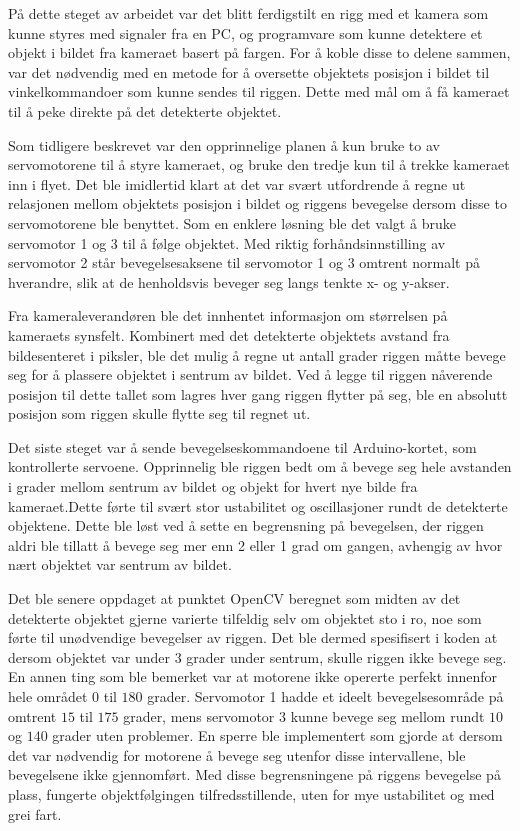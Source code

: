 På dette steget av arbeidet var det blitt ferdigstilt en rigg med et kamera som kunne styres med signaler fra en PC, og programvare som kunne detektere et objekt i bildet fra kameraet basert på fargen. For å koble disse to delene sammen, var det nødvendig med en metode for å oversette objektets posisjon i bildet til vinkelkommandoer som kunne sendes til riggen. Dette med mål om å få kameraet til å peke direkte på det detekterte objektet.

Som tidligere beskrevet var den opprinnelige planen å kun bruke to av servomotorene til å styre kameraet, og bruke den tredje kun til å trekke kameraet inn i flyet. Det ble imidlertid klart at det var svært utfordrende å regne ut relasjonen mellom objektets posisjon i bildet og riggens bevegelse dersom disse to servomotorene ble benyttet. Som en enklere løsning ble det valgt å bruke servomotor 1 og 3 til å følge objektet. Med riktig forhåndsinnstilling av servomotor 2 står bevegelsesaksene til servomotor 1 og 3 omtrent normalt på hverandre, slik at de henholdsvis beveger seg langs tenkte x- og y-akser.

Fra kameraleverandøren ble det innhentet informasjon om størrelsen på kameraets synsfelt. Kombinert med det detekterte objektets avstand fra bildesenteret i piksler, ble det mulig å regne ut antall grader riggen måtte bevege seg for å plassere objektet i sentrum av bildet. Ved å legge til riggen nåverende posisjon til dette tallet som lagres hver gang riggen flytter på seg, ble en absolutt posisjon som riggen skulle flytte seg til regnet ut.

Det siste steget var å sende bevegelseskommandoene til Arduino-kortet, som kontrollerte servoene. Opprinnelig ble riggen bedt om å bevege seg hele avstanden i grader mellom sentrum av bildet og objekt for hvert nye bilde fra kameraet.Dette førte til svært stor ustabilitet og oscillasjoner rundt de detekterte objektene. Dette ble løst ved å sette en begrensning på bevegelsen, der riggen aldri ble tillatt å bevege seg mer enn 2 eller 1 grad om gangen, avhengig av hvor nært objektet var sentrum av bildet.

Det ble senere oppdaget at punktet OpenCV beregnet som midten av det detekterte objektet gjerne varierte tilfeldig selv om objektet sto i ro, noe som førte til unødvendige bevegelser av riggen. Det ble dermed spesifisert i koden at dersom objektet var under 3 grader under sentrum, skulle riggen ikke bevege seg. En annen ting som ble bemerket var at motorene ikke opererte perfekt innenfor hele området $0$ til $180$ grader. Servomotor 1 hadde et ideelt bevegelsesområde på omtrent $15$ til $175$ grader, mens servomotor 3 kunne bevege seg mellom rundt $10$ og $140$ grader uten problemer. En sperre ble implementert som gjorde at dersom det var nødvendig for motorene å bevege seg utenfor disse intervallene, ble bevegelsene ikke gjennomført. Med disse begrensningene på riggens bevegelse på plass, fungerte objektfølgingen tilfredsstillende, uten for mye ustabilitet og med grei fart.
